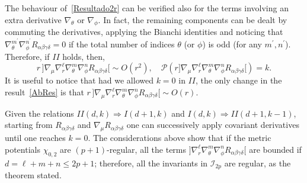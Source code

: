 \documentclass[aps,prd,a4paper,twocolumn,showpacs,showkeys,preprintnumbers,amsmath,amssymb,nofootinbib]{revtex4-2}
\numberwithin{equation}{section}
\def\beq{\begin{equation}}
\def\eeq{\end{equation}}
\def\al{\alpha}
\def\be{\beta}
\def\ga{\gamma}
\def\de{\delta}
\def\th{\theta}
\def\na{\nabla}
\begin{document}
The behaviour of~\eqref{Resultado2r} can be verified also for the terms involving an extra derivative $\na_\th$ or $\na_\phi$. In fact, the remaining components can be dealt by commuting the derivatives, applying the Bianchi identities and noticing that $\na_\th^{m^\prime} \na_\phi^{n^\prime} R_{\al\be\ga\de}=0$ if the total number of indices $\th$ (or $\phi$) is odd (for any $m^\prime,n^\prime$).
Therefore, if $II$ holds, then,
%
\beq \label{AbRes}
{r \,] \na_\mu \na_r^\ell \na_\th^m \na_\phi^n R_{\al\be\ga\de} [} \sim O(r^2) ,
\quad
\mathscr{P}(r{]\na_\mu \na_r^\ell \na_\th^m \na_\phi^n R_{\al\be\ga\de}[})=k.
\eeq
It is useful to notice that had we allowed $k=0$ in $II$, the only change in the result~\eqref{AbRes} is that ${r \,] \na_\mu \na_r^\ell \na_\th^m \na_\phi^n R_{\al\be\ga\de} [} \sim O(r)$.

Given the relations $II(d,k) \Longrightarrow I(d+1,k)$ and $I(d,k) \Longrightarrow II(d+1,k-1)$, starting from $R_{\al\be\ga\de}$ and $\na_\mu R_{\al\be\ga\de}$ one can successively apply covariant derivatives until one reaches $k=0$. The considerations above show that if the metric potentials $\chi_{0,2}$ are $(p+1)$-regular, 
all the terms ${]\na_r^\ell \na_\th^m \na_\phi^n R_{\al\be\ga\de}[}$ are bounded if $d = \ell + m + n \leqslant 2p+1$;
therefore, all the invariants in $\mathscr{I}_{2p}$ are regular, as the theorem stated.
\end{document}
